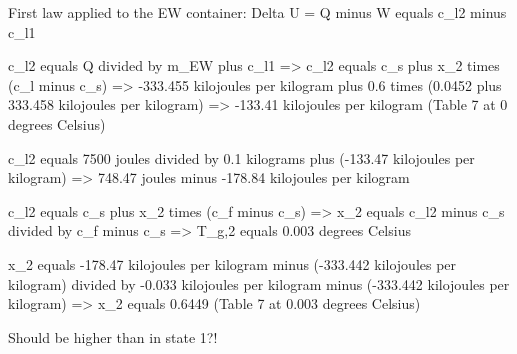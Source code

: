 First law applied to the EW container:  
Delta U = Q minus W equals c_l2 minus c_l1  

c_l2 equals Q divided by m_EW plus c_l1  
=> c_l2 equals c_s plus x_2 times (c_l minus c_s)  
=> -333.455 kilojoules per kilogram plus 0.6 times (0.0452 plus 333.458 kilojoules per kilogram)  
=> -133.41 kilojoules per kilogram (Table 7 at 0 degrees Celsius)  

c_l2 equals 7500 joules divided by 0.1 kilograms plus (-133.47 kilojoules per kilogram)  
=> 748.47 joules minus -178.84 kilojoules per kilogram  

c_l2 equals c_s plus x_2 times (c_f minus c_s)  
=> x_2 equals c_l2 minus c_s divided by c_f minus c_s  
=> T_g,2 equals 0.003 degrees Celsius  

x_2 equals -178.47 kilojoules per kilogram minus (-333.442 kilojoules per kilogram) divided by -0.033 kilojoules per kilogram minus (-333.442 kilojoules per kilogram)  
=> x_2 equals 0.6449 (Table 7 at 0.003 degrees Celsius)  

Should be higher than in state 1?!